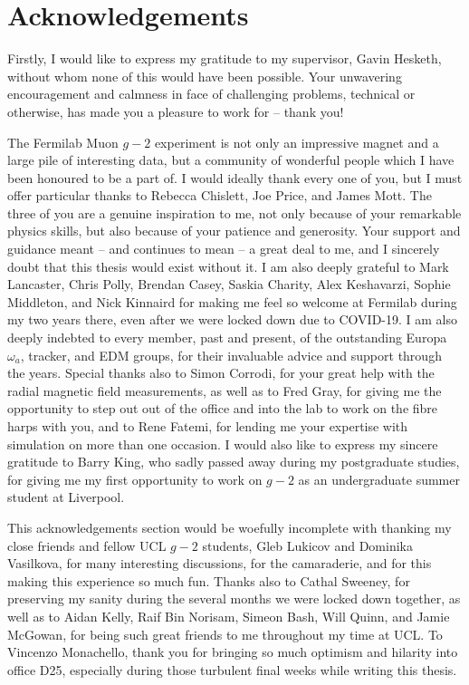 \chapter*{Acknowledgements}

Firstly, I would like to express my gratitude to my supervisor, Gavin Hesketh, without whom none of this would have been possible. Your unwavering encouragement and calmness in face of challenging problems, technical or otherwise, has made you a pleasure to work for -- thank you! 

The Fermilab Muon $g-2$ experiment is not only an impressive magnet and a large pile of interesting data, but a community of wonderful people which I have been honoured to be a part of. I would ideally thank every one of you, but I must offer particular thanks to Rebecca Chislett, Joe Price, and James Mott. The three of you are a genuine inspiration to me, not only because of your remarkable physics skills, but also because of your patience and generosity. Your support and guidance meant -- and continues to mean -- a great deal to me, and I sincerely doubt that this thesis would exist without it. I am also deeply grateful to Mark Lancaster, Chris Polly, Brendan Casey, Saskia Charity, Alex Keshavarzi, Sophie Middleton, and Nick Kinnaird for making me feel so welcome at Fermilab during my two years there, even after we were locked down due to COVID-19. I am also deeply indebted to every member, past and present, of the outstanding Europa $\omega_{a}$, tracker, and EDM groups, for their invaluable advice and support through the years. Special thanks also to Simon Corrodi, for your great help with the radial magnetic field measurements, as well as to Fred Gray, for giving me the opportunity to step out out of the office and into the lab to work on the fibre harps with you, and to Rene Fatemi, for lending me your expertise with simulation on more than one occasion. I would also like to express my sincere gratitude to Barry King, who sadly passed away during my postgraduate studies, for giving me my first opportunity to work on $g-2$ as an undergraduate summer student at Liverpool. 

This acknowledgements section would be woefully incomplete with thanking my close friends and fellow UCL $g-2$ students, Gleb Lukicov and Dominika Vasilkova, for many interesting discussions, for the camaraderie, and for this making this experience so much fun. Thanks also to Cathal Sweeney, for preserving my sanity during the several months we were locked down together, as well as to Aidan Kelly, Raif Bin Norisam, Simeon Bash, Will Quinn, and Jamie McGowan, for being such great friends to me throughout my time at UCL. To Vincenzo Monachello, thank you for bringing so much optimism and hilarity into office D25, especially during those turbulent final weeks while writing this thesis. 

